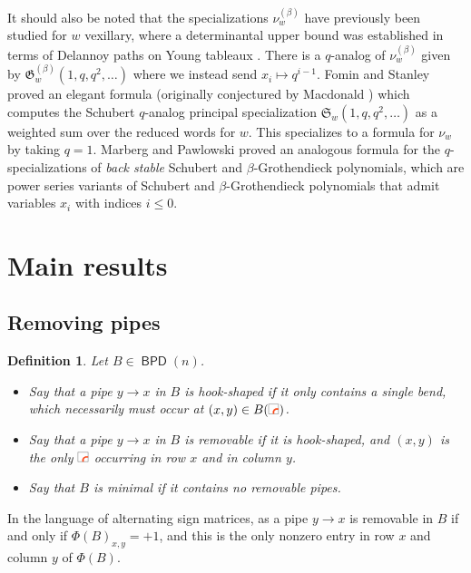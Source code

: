 \documentclass[11pt]{article}
\newtheorem{definition}[theo]{Definition}
\theoremstyle{definition}
\numberwithin{equation}{section}
\newcommand{\fk}{\mathfrak}
\DeclareMathOperator{\BPD}{\mathsf{BPD}}
\newcommand{\pipecolor}{UForange}
\newcommand{\tilescale}{0.27}
\newcommand{\drawSquare}{
    \draw[
        xshift=0.5cm,yshift=0.5cm,
        black,opacity=0.5,thin
    ] (0,0) rectangle (1,1);
}
\newcommand{\drawRelbow}[2]{
    \draw[color=\pipecolor,very thick]
    (#1,#2-0.5) to (#1,#2-0.25) to[bend left] (#1+0.25,#2) to (#1+0.5,#2);
}
\newcommand{\relbow}[1][scale=\tilescale,baseline=4pt]{
    \begin{tikzpicture}[#1]
    \drawSquare
    \drawRelbow11
    \end{tikzpicture}
}
\begin{document}
It should also be noted that the specializations $\nu^{(\beta)}_w$ have previously been studied for $w$ vexillary, where a determinantal upper bound was established in terms of Delannoy paths on Young tableaux \cite{MPP22}.
There is a $q$-analog of $\nu^{(\beta)}_w$ given by $\fk G^{(\beta)}_w(1,q,q^2,\dots)$ where we instead send $x_i\mapsto q^{i-1}$.
Fomin and Stanley \cite{FS94} proved an elegant formula (originally conjectured by Macdonald \cite{Mac91}) which computes the Schubert $q$-analog principal specialization $\fk S_w(1,q,q^2,\dots)$ as a weighted sum over the reduced words for $w$.
This specializes to a formula for $\nu_w$ by taking $q=1$.
Marberg and Pawlowski \cite{MP21} proved an analogous formula for the $q$-specializations of \textit{back stable} Schubert and $\beta$-Grothendieck polynomials, which are power series variants of Schubert and $\beta$-Grothendieck polynomials that admit variables $x_i$ with indices $i\leq 0$.





\section{Main results}

\subsection{Removing pipes}
\label{sect:rem_pipes}

\begin{definition}
    Let $B\in \BPD(n)$.
    \begin{itemize}
        \item Say that a pipe $y\to x$ in $B$ is \textit{hook-shaped} if it only contains a single bend, which necessarily must occur at $(x,y)\in B(\relbow)$.
        \item Say that a pipe $y\to x$ in $B$ is \textit{removable} if it is hook-shaped, and $(x,y)$ is the only $\relbow$ occurring in row $x$ and in column $y$.
        \item Say that $B$ is \textit{minimal} if it contains no removable pipes.
    \end{itemize}
\end{definition}

In the language of alternating sign matrices, as a pipe $y\to x$ is removable in $B$ if and only if $\Phi(B)_{x,y} = +1$, and this is the only nonzero entry in row $x$ and column $y$ of $\Phi(B)$.
\end{document}
